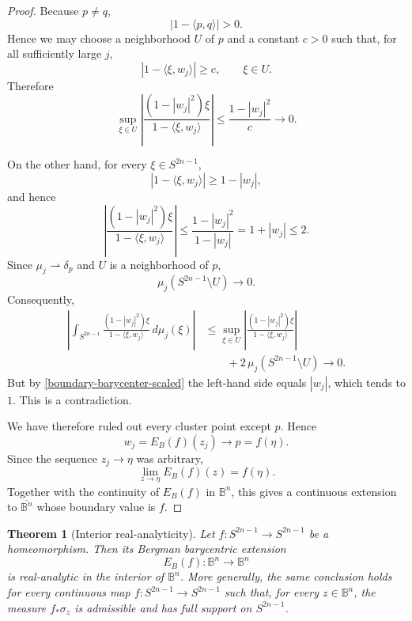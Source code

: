 \documentclass[11pt]{article}
\newtheorem{theorem}{Theorem}[section]
\theoremstyle{definition}
\theoremstyle{remark}
\theoremstyle{definition}
\newcommand{\B}{\mathbb B}
\begin{document}
\begin{proof}
Because \(p\ne q\),
\[
        |1-\langle p,q\rangle|>0.
\]
Hence we may choose a neighborhood \(U\) of \(p\) and a constant \(c>0\)
such that, for all sufficiently large \(j\),
\[
        |1-\langle \xi,w_j\rangle|\ge c,
        \qquad \xi\in U.
\]
Therefore
\[
\sup_{\xi\in U}
\left|
\frac{(1-|w_j|^2)\xi}
     {1-\langle \xi,w_j\rangle}
\right|
\le
\frac{1-|w_j|^2}{c}
\longrightarrow0.
\]

On the other hand, for every \(\xi\in S^{2n-1}\),
\[
        |1-\langle \xi,w_j\rangle|
        \ge 1-|w_j|,
\]
and hence
\[
\left|
\frac{(1-|w_j|^2)\xi}
     {1-\langle \xi,w_j\rangle}
\right|
\le
\frac{1-|w_j|^2}{1-|w_j|}
=
1+|w_j|
\le2.
\]
Since \(\mu_j\rightharpoonup\delta_p\) and \(U\) is a neighborhood of \(p\),
\[
        \mu_j(S^{2n-1}\setminus U)\longrightarrow0.
\]
Consequently,
\[
\begin{aligned}
\left|
\int_{S^{2n-1}}
\frac{(1-|w_j|^2)\xi}
     {1-\langle \xi,w_j\rangle}\,d\mu_j(\xi)
\right|
&\le
\sup_{\xi\in U}
\left|
\frac{(1-|w_j|^2)\xi}
     {1-\langle \xi,w_j\rangle}
\right|  \\
&\qquad
+2\,\mu_j(S^{2n-1}\setminus U)
\longrightarrow0.
\end{aligned}
\]
But by \eqref{boundary-barycenter-scaled} the left-hand side equals
\(|w_j|\), which tends to \(1\). This is a contradiction.

We have therefore ruled out every cluster point except \(p\). Hence
\[
        w_j=E_B(f)(z_j)\longrightarrow p=f(\eta).
\]
Since the sequence \(z_j\to\eta\) was arbitrary,
\[
        \lim_{z\to\eta}E_B(f)(z)=f(\eta).
\]
Together with the continuity of \(E_B(f)\) in \(\B^n\), this gives a
continuous extension to \(\overline{\B^n}\) whose boundary value is \(f\).
\end{proof}
\begin{theorem}[Interior real-analyticity]\label{smooth-regularity}
Let \(f:S^{2n-1}\to S^{2n-1}\) be a homeomorphism. Then its Bergman
barycentric extension
\[
        E_B(f):\B^n\to\B^n
\]
is real-analytic in the interior of \(\B^n\). More generally, the same
conclusion holds for every continuous map \(f:S^{2n-1}\to S^{2n-1}\) such that,
for every \(z\in\B^n\), the measure \(f_*\sigma_z\) is admissible and has full
support on \(S^{2n-1}\).
\end{theorem}
\end{document}
